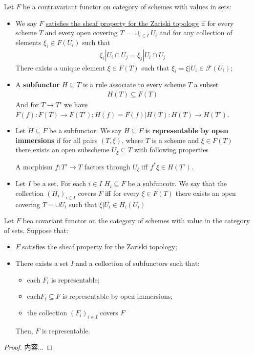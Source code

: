 \documentclass[Total.tex]{subfiles}
\begin{document}
			\begin{Def} Let $F$ be a contravariant functor on category of schemes with values in sets:
				\begin{itemize}
					\item We say $F$ \underline{satisfies the sheaf property for the Zariski topology} if for every scheme $T$ and every open covering $T=\cup_{i\in I} U_i$ and for any collection of elements $\xi_i\in F(U_i)$ such that
					\begin{gather*}
						\xi_i|U_i\cap U_j=\xi_j|U_i\cap U_j
					\end{gather*}
					There exists a unique element $\xi\in F(T)$ such that $\xi_i=\xi|U_i\in \mathcal{F}(U_i)$;
					\item A \textbf{subfunctor } $H\subseteq T$ is a rule associate to every scheme $T$ a subset
					\begin{gather*}
						H(T)\subseteq F(T)
					\end{gather*} 
					And for $T\rightarrow T'$ we have $F(f):F(T)\rightarrow F(T');H(f)=F(f)|H(T):H(T)\rightarrow H(T')$.
					\item Let $H\subseteq F$ be a subfunctor. We say $H\subseteq F$ is \textbf{representable by open immersions} if for all pairs $(T,\xi)$, where $T$ is a scheme and $\xi\in F(T)$ there exists an open subscheme $U_\xi\subseteq T$ with following properties
					\begin{center}
						A morphism $f:T'\rightarrow T$ factors through $U_\xi$ iff $f^*\xi\in H(T')$.
					\end{center}
					\item Let $I$ be a set. For each $i\in I$ $H_i\subseteq F$ be a subfuncotr. We say that the collection $(H_i)_{i\in I}$ covers $F$ iff for every $\xi\in F(T)$ there exists an open covering $T=\cup U_i$ such that $\xi|U_i\in H_i(U_i)$
				\end{itemize}
			\end{Def}
			
			\begin{lemma}
				Let $F$ bea covariant functor on the category of schemes with value in the category of sets. Suppose that:
				\begin{itemize}
					\item $F$ satisfies the sheaf property for the Zariski topology;
					\item There exists a set $I$ and a collection of subfunctors such that:
					\begin{itemize}
						\item each $F_i$ is representable;
						\item each$F_i\subseteq F$ is representable by open immersions;
						\item the collection $(F_i)_{i\in I}$ covers $F$
					\end{itemize}
					Then, $F$ is representable.
				\end{itemize}
			\end{lemma}
			\begin{proof}
				内容...
			\end{proof}
			
\end{document}
